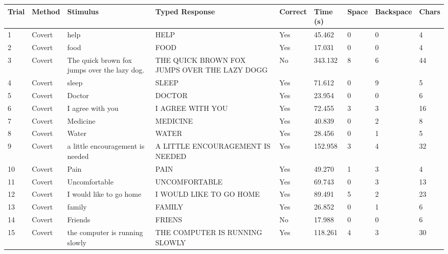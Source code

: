 \documentclass[10pt,a4paper]{article}
\begin{document}
\begin{center}
\begin{tabularx}{\textwidth}{
    C{0.45in}
    C{0.65in}
    L{2.35in}
    L{2.55in}
    C{0.65in}
    C{0.65in}
    C{0.55in}
    C{0.75in}
    C{0.55in}
}
\toprule

\textbf{Trial} &
\textbf{Method} &
\textbf{Stimulus} &
\textbf{Typed Response} &
\textbf{Correct} &
\textbf{Time (s)} &
\textbf{Space} &
\textbf{Backspace} &
\textbf{Chars}
\\

\midrule

1 &
Covert &
help &
HELP &
Yes &
45.462 &
0 &
0 &
4
\\

2 &
Covert &
food &
FOOD &
Yes &
17.031 &
0 &
0 &
4
\\

3 &
Covert &
The quick brown fox jumps over the lazy dog. &
THE QUICK BROWN FOX JUMPS OVER THE LAZY DOGG &
No &
343.132 &
8 &
6 &
44
\\

4 &
Covert &
sleep &
SLEEP &
Yes &
71.612 &
0 &
9 &
5
\\

5 &
Covert &
Doctor &
DOCTOR &
Yes &
23.954 &
0 &
0 &
6
\\

6 &
Covert &
I agree with you &
I AGREE WITH YOU &
Yes &
72.455 &
3 &
3 &
16
\\

7 &
Covert &
Medicine &
MEDICINE &
Yes &
40.839 &
0 &
2 &
8
\\

8 &
Covert &
Water &
WATER &
Yes &
28.456 &
0 &
1 &
5
\\

9 &
Covert &
a little encouragement is needed &
A LITTLE ENCOURAGEMENT IS NEEDED &
Yes &
152.958 &
3 &
4 &
32
\\

10 &
Covert &
Pain &
PAIN &
Yes &
49.270 &
1 &
3 &
4
\\

11 &
Covert &
Uncomfortable &
UNCOMFORTABLE &
Yes &
69.743 &
0 &
3 &
13
\\

12 &
Covert &
I would like to go home &
I WOULD LIKE TO GO HOME &
Yes &
89.491 &
5 &
2 &
23
\\

13 &
Covert &
family &
FAMILY &
Yes &
26.852 &
0 &
1 &
6
\\

14 &
Covert &
Friends &
FRIENS &
No &
17.988 &
0 &
0 &
6
\\

15 &
Covert &
the computer is running slowly &
THE COMPUTER IS RUNNING SLOWLY &
Yes &
118.261 &
4 &
3 &
30
\\

\bottomrule
\end{tabularx}
\end{center}
\end{document}

